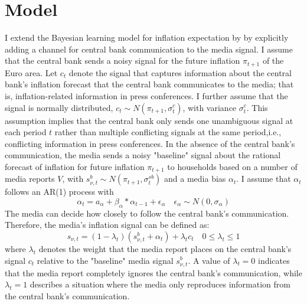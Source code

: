 \documentclass[review]{elsarticle}
\begin{document}
\section{Model}\label{sec:Model} 
I extend the Bayesian learning model for inflation expectation by \cite{LamlaLein2014} by explicitly adding a channel for central bank communication to the media signal. I assume that the central bank sends a noisy signal for the future inflation $\pi_{t+1}$ of the Euro area. Let $c_t$ denote the signal that captures information about the central bank's inflation forecast that the central bank communicates to the media; that is, inflation-related information in press conferences. I further assume that the signal is normally distributed, $c_t \sim N(\pi_{t+1}, \sigma^c_t)$, with variance $\sigma^c_t$. This assumption implies that the central bank only sends one unambiguous signal at each period $t$ rather than multiple conflicting signals at the same period,i.e., conflicting information in press conferences.
In the absence of the central bank's communication, the media sends a noisy "baseline" signal about the rational forecast of inflation for future inflation $\pi_{t+1}$ to households based on a number of media reports $V$, with $s^b_{\nu,t} \sim N(\pi_{t+1}, \sigma^{sb}_t)$ and a media bias $\alpha_t$. I assume that $\alpha_t$ follows an AR(1) process with 
\begin{equation}
\alpha_t = a_{\alpha} + \beta_{\alpha}*\alpha_{t-1} + \epsilon_{\alpha} \quad \epsilon_{\alpha} \sim N(0, \sigma_{\alpha})
\end{equation}
The media can decide how closely to follow the central bank's communication. Therefore, the media's inflation signal can be defined as:
\begin{equation}
s_{\nu,t} = (1-\lambda_{t}) (s^b_{\nu,t} + \alpha_t) + \lambda_{t} c_t \quad 0\leq \lambda_{t} \leq 1
\end{equation}
where $\lambda_{t}$ denotes the weight that the media report places on the central bank's signal $c_t$ relative to the "baseline" media signal $s^b_{\nu,t}$. A value of $\lambda_{t} = 0$ indicates that the media report completely ignores the central bank's communication, while $\lambda_{t} = 1$ describes a situation where the media only reproduces information from the central bank's communication. 
\end{document}
